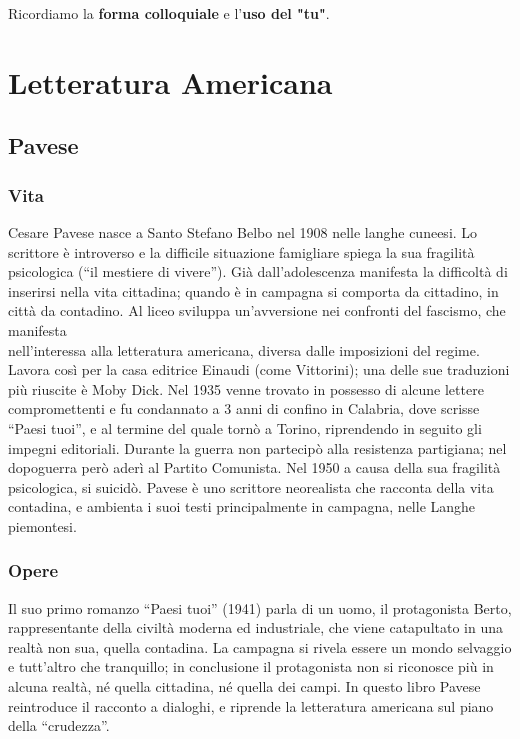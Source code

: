 \documentclass[10pt]{report}
\begin{document}
		Ricordiamo la \textbf{forma colloquiale} e l'\textbf{uso del "tu"}.
	
	\chapter*{Letteratura Americana}
	
		\section{Pavese}
		\subsection[Vita]{Vita}
		Cesare Pavese nasce a Santo Stefano Belbo nel 1908 nelle langhe cuneesi. Lo scrittore è introverso e la difficile situazione famigliare spiega la sua fragilità psicologica (“il mestiere di vivere”). Già dall’adolescenza manifesta la difficoltà di inserirsi nella vita cittadina; quando è in campagna si comporta da cittadino, in città da contadino. 
		Al liceo sviluppa un’avversione nei confronti del fascismo, che manifesta \\nell’interessa alla letteratura americana, diversa dalle imposizioni del regime. Lavora così per la casa editrice Einaudi (come Vittorini); una delle sue traduzioni più riuscite è Moby Dick. Nel 1935 venne trovato in possesso di alcune lettere compromettenti e fu condannato a 3 anni di confino in Calabria, dove scrisse “Paesi tuoi”, e al termine del quale tornò a Torino, riprendendo in seguito gli impegni editoriali. Durante la guerra non partecipò alla resistenza partigiana; nel dopoguerra però aderì al Partito Comunista. Nel 1950 a causa della sua fragilità psicologica, si suicidò.
		Pavese è uno scrittore neorealista che racconta della vita contadina, e ambienta i suoi testi principalmente in campagna, nelle Langhe piemontesi.  
		
		\subsection[Opere]{Opere}	
		Il suo primo romanzo “Paesi tuoi” (1941) parla di un uomo, il protagonista Berto, rappresentante della civiltà moderna ed industriale, che viene catapultato in una realtà non sua, quella contadina. La campagna si rivela essere un mondo selvaggio e tutt’altro che tranquillo; in conclusione il protagonista non si riconosce più in alcuna realtà, né quella cittadina, né quella dei campi. In questo libro Pavese reintroduce il racconto a dialoghi, e riprende la letteratura americana sul piano della “crudezza”.
		
\end{document}
